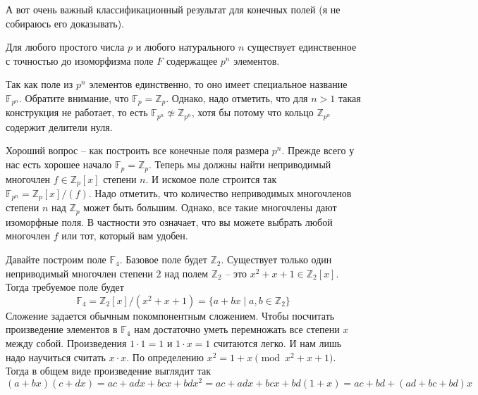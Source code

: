 А вот очень важный классификационный результат для конечных полей (я не собираюсь его доказывать).

\begin{claim}
Для любого простого числа $p$ и любого натурального $n$ существует единственное с точностью до изоморфизма поле $F$ содержащее $p^n$ элементов.
\end{claim}

Так как поле из $p^n$ элементов единственно, то оно имеет специальное название $\mathbb F_{p^n}$.
Обратите внимание, что $\mathbb F_p = \mathbb Z_p$.
Однако, надо отметить, что для $n > 1$ такая конструкция не работает, то есть $\mathbb F_{p^n}\not\simeq\mathbb Z_{p^n}$, хотя бы потому что кольцо $\mathbb Z_{p^n}$ содержит делители нуля.

Хороший вопрос -- как построить все конечные поля размера $p^n$.
Прежде всего у нас есть хорошее начало $\mathbb F_p = \mathbb Z_p$.
Теперь мы должны найти неприводимый многочлен $f\in \mathbb Z_p[x]$ степени $n$.
И искомое поле строится так $\mathbb F_{p^n} = \mathbb Z_p[x]/(f)$.
Надо отметить, что количество неприводимых многочленов степени $n$ над $\mathbb Z_p$ может быть большим.
Однако, все такие многочлены дают изоморфные поля.
В частности это означает, что вы можете выбрать любой многочлен $f$ или тот, который вам удобен.

\begin{example}
Давайте построим поле $\mathbb F_4$.
Базовое поле будет $\mathbb Z_2$.
Существует только один неприводимый многочлен степени $2$ над полем $\mathbb Z_2$ -- это $x^2 + x + 1 \in \mathbb Z_2[x]$.
Тогда требуемое поле будет
\[
\mathbb F_4 = \mathbb Z_2[x]/(x^2 + x + 1) = \{a + b x\mid a, b\in \mathbb Z_2\}
\]
Сложение задается обычным покомпонентным сложением.
Чтобы посчитать произведение элементов в $\mathbb F_4$ нам достаточно уметь перемножать все степени $x$ между собой.
Произведения $1\cdot 1 = 1$ и $1\cdot x = 1$ считаются легко.
И нам лишь надо научиться считать $x\cdot x$.
По определению $x^2 = 1 + x  \pmod{x^2 + x + 1}$.
Тогда в общем виде произведение выглядит так
\[
(a+bx)(c+d x) = ac + ad x + bc x + bd x^2 = ac + ad x + bc x + bd (1+x) = ac + bd + (ad + bc + bd) x
\]
\end{example}


